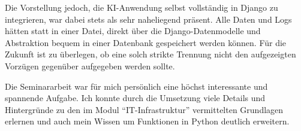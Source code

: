 \documentclass[12pt,oneside,titlepage,listof=totoc,bibliography=totoc]{scrartcl}
\begin{document}
Die Vorstellung jedoch, die KI-Anwendung selbst vollständig in Django zu integrieren, war dabei stets als sehr naheliegend präsent. Alle Daten und Logs hätten statt in einer Datei, direkt über die Django-Datenmodelle und Abstraktion bequem in einer Datenbank gespeichert werden können.  Für die Zukunft ist zu überlegen, ob eine solch strikte Trennung nicht den aufgezeigten Vorzügen gegenüber aufgegeben werden sollte. 

Die Seminararbeit war für mich persönlich eine höchst interessante und  spannende Aufgabe. Ich konnte durch die Umsetzung viele Details und Hintergründe zu den im Modul \enquote{IT-Infrastruktur} vermittelten Grundlagen erlernen und auch mein Wissen um Funktionen in Python deutlich erweitern. 






\newpage
\end{document}
